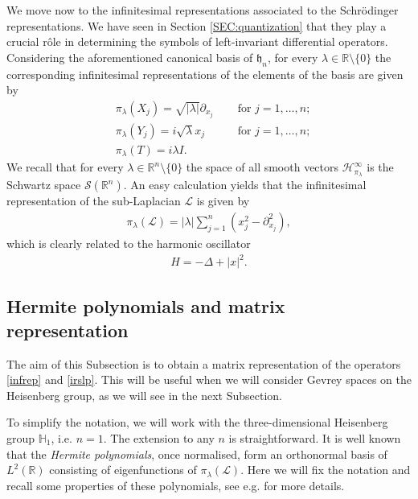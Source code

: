 \documentclass[12pt,oneside,a4paper]{book}
\numberwithin{equation}{section}     %
\theoremstyle{plain}
\theoremstyle{definition}
\newcommand{\R}{{\mathbb R}}
\newcommand{\Rn}{{\R}^n}
\newcommand{\slp}{{\mathcal L}}
\begin{document}
We move now to the infinitesimal representations associated to the Schr\"odinger representations. We have seen in Section \ref{SEC:quantization} that they play a crucial r\^ole in determining the symbols of left-invariant differential operators. Considering the aforementioned canonical basis of $\mathfrak h_n$, for every $\lambda \in\R\setminus\{0\}$ the corresponding infinitesimal representations of the elements of the basis are given by
\begin{subequations}
	\label{infrep}
	\begin{align}
	&\pi_\lambda(X_j)=\sqrt{|\lambda|}\partial_{x_j}\quad&\text{ for }j=1,\dots,n;\label{eq1}\\
	&\pi_\lambda(Y_j)=i\sqrt\lambda x_j \quad&\text{ for }j=1,\dots,n;\label{eq2}\\
	&\pi_\lambda(T)=i\lambda I.\label{eq3}
	\end{align}
\end{subequations}
We recall that for every $\lambda\in\Rn\setminus\{0\}$ the space of all smooth vectors $\mathcal H^\infty_{\pi_\lambda}$ is the Schwartz space $\mathcal{S}(\Rn)$. An easy calculation yields that the infinitesimal representation of the sub-Laplacian $\slp$ is given by 
\begin{align}\label{irslp}
\pi_\lambda(\slp)=|\lambda|\sum_{j=1}^n(x_j^2-\partial_{x_j}^2),
\end{align}
which is clearly related to the harmonic oscillator 
\begin{align*}
H=-\Delta + |x|^2. 
\end{align*}
\subsection{Hermite polynomials and matrix representation}

The aim of this Subsection is to obtain a matrix representation of the operators 
\eqref{infrep} and \eqref{irslp}. This will be useful when we will consider Gevrey spaces on the Heisenberg group, as we will see in the next Subsection.

To simplify the notation, we will work with the three-dimensional Heisenberg group $\mathbb{H}_1$, i.e. $n=1$. The extension to any $n$ is straightforward. It is well known that the \textit{Hermite polynomials}, once normalised, form an orthonormal basis of $L^2(\R)$ consisting of eigenfunctions of $\pi_\lambda(\slp)$. Here we will fix the notation and recall some properties of these polynomials, see e.g. \cite{S1975} for more details. 
\end{document}

